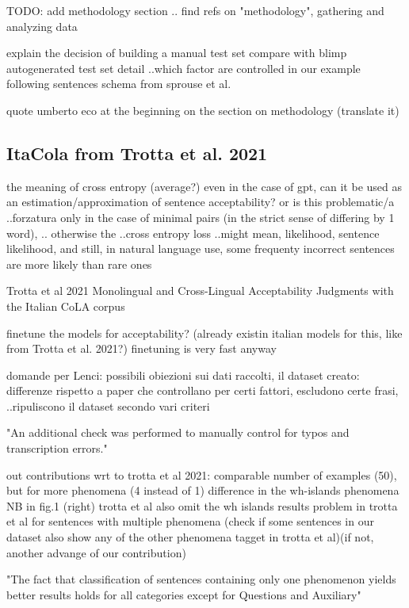 TODO: add methodology section .. find refs on "methodology", gathering and analyzing data

explain the decision of building a manual test set
compare with blimp autogenerated test set
detail ..which factor are controlled in our example
following sentences schema from sprouse et al.



quote umberto eco at the beginning on the section on methodology
(translate it)

\subsection{ItaCola from Trotta et al. 2021}

the meaning of cross entropy (average?)
even in the case of gpt, can it be used as an estimation/approximation of sentence acceptability?
or is this problematic/a ..forzatura
only in the case of minimal pairs (in the strict sense of differing by 1 word), ..
otherwise the ..cross entropy loss ..might mean, likelihood, sentence likelihood, and still, in natural language use, some frequenty incorrect sentences are more likely than rare ones

Trotta et al 2021 Monolingual and Cross-Lingual Acceptability Judgments with the Italian CoLA corpus

finetune the models for acceptability? (already existin italian models for this, like from Trotta et al. 2021?)
finetuning is very fast anyway 

domande per Lenci:
possibili obiezioni sui dati raccolti, il dataset creato:
differenze rispetto a paper che controllano per certi fattori, escludono certe frasi, ..ripuliscono il dataset secondo vari criteri

"An additional check was performed to manually
control for typos and transcription errors."

out contributions wrt to trotta et al 2021:
comparable number of examples (50), but for more phenomena (4 instead of 1)
difference in the wh-islands phenomena
NB in fig.1 (right) trotta et al also omit the wh islands results
problem in trotta et al for sentences with multiple phenomena
(check if some sentences in our dataset also show any of the other phenomena tagget in trotta et al)(if not, another advange of our contribution)

"The fact that classification of sentences containing only one phenomenon yields better results holds for all categories except for Questions and Auxiliary"

